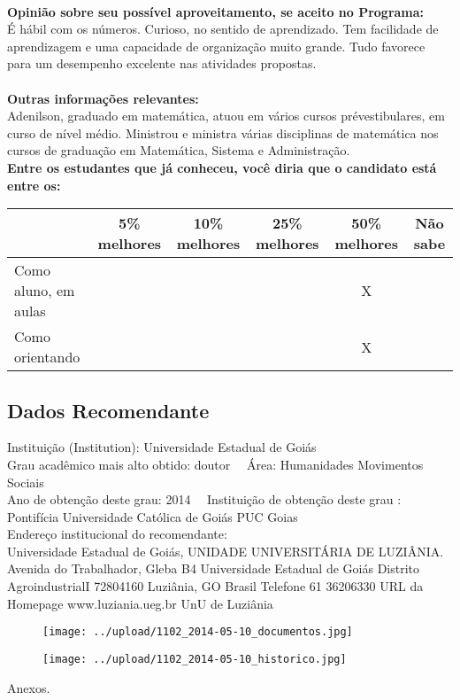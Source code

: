 \documentclass[11pt]{article}
\begin{document}
\\
\textbf{Opinião sobre seu possível aproveitamento, se aceito no Programa:}
\\É hábil com os números. Curioso, no sentido de aprendizado. Tem facilidade de aprendizagem e uma capacidade de organização muito grande. Tudo favorece para um desempenho excelente nas atividades propostas.\\ 
\\
\textbf{Outras informações relevantes:} \\Adenilson,  graduado em matemática, atuou em vários cursos prévestibulares, em curso de nível médio. Ministrou e ministra várias disciplinas de matemática nos cursos de graduação em Matemática, Sistema e Administração.
\\[0.3cm]
\textbf{Entre os estudantes que já conheceu, você diria que o candidato está entre os:}
\\
\begin{tabular}{|l|c|c|c|c|c|}
\hline
 & 5\% melhores & 10\% melhores & 25\% melhores & 50\% melhores & Não sabe \\
\hline
Como aluno, em aulas &  &  &  & X & \\
\hline
Como orientando &  &  &  & X & \\
\hline
\end{tabular}
\subsection*{Dados Recomendante} 
	Instituição (Institution): Universidade Estadual de Goiás
\\ 
	Grau acadêmico mais alto obtido: doutor
	\ \ Área: Humanidades  Movimentos Sociais
	\\
	Ano de obtenção deste grau: 2014
	\ \ 
	Instituição de obtenção deste grau : Pontifícia Universidade Católica de Goiás  PUC Goias
	\\ 
	Endereço institucional do recomendante: \\ Universidade Estadual de Goiás, UNIDADE UNIVERSITÁRIA DE LUZIÂNIA.
Avenida do Trabalhador, Gleba B4
Universidade Estadual de Goiás 
Distrito AgroindustrialI
72804160  Luziânia, GO  Brasil
Telefone 61 36206330
URL da Homepage www.luziania.ueg.br UnU de Luziânia	
\begin{figure}[!htb]
\texttt{[image: ../upload/1102\_2014-05-10\_documentos.jpg]}
\end{figure}	
\begin{figure}[!htb]
\texttt{[image: ../upload/1102\_2014-05-10\_historico.jpg]}
\end{figure} 
\begin{center}
Anexos.
\end{center}
\end{document}
